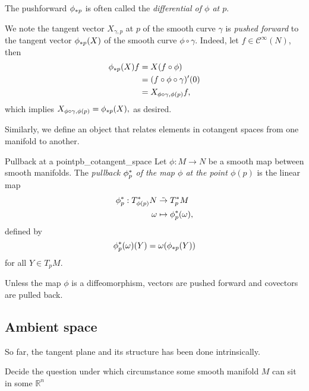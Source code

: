 \begin{remark}
    The pushforward \(\pf[p]{\phi}\) is often called the \emph{differential of \(\phi\) at \(p\)}.
\end{remark}

We note the tangent vector \(X_{\gamma,p}\) at \(p\) of the smooth curve \(\gamma\) is \emph{pushed forward} to the tangent vector \(\pf[p]{\phi}(X)\) of the smooth curve \(\phi \circ \gamma.\) Indeed, let \(f \in \mathcal{C}^\infty(N)\), then
\begin{align*}
    \pf[p]\phi(X)f &= X(f \circ \phi)\\
                   &= (f \circ \phi \circ \gamma)'(0)\\
                   &= X_{\phi \circ \gamma, \phi(p)} f,
\end{align*}
which implies \(X_{\phi \circ \gamma, \phi(p)} = \pf[p]\phi(X),\) as desired.

Similarly, we define an object that relates elements in cotangent spaces from one manifold to another.

\begin{definition}{Pullback at a point}{pb_cotangent_space}
    Let \(\phi : M \to N\) be a smooth map between smooth manifolds. The \emph{pullback \(\pb[p]\phi\) of the map \(\phi\) at the point \(\phi(p)\)} is the linear map
    \begin{align*}
        \pb[p]\phi : T_{\phi(p)}^{\ast}N &\linear T_{p}^{\ast}M\\
        \omega &\mapsto \pb[p]\phi(\omega),
    \end{align*}
    defined by
    \begin{equation*}
        \pb[p]\phi(\omega)(Y) = \omega(\pf[p]\phi(Y))
    \end{equation*}
    for all \(Y \in T_pM\).
\end{definition}
\begin{remark}
    Unless the map \(\phi\) is a diffeomorphism, vectors are pushed forward and covectors are pulled back.
\end{remark}

\subsection{Ambient space}
So far, the tangent plane and its structure has been done intrinsically.

Decide the question under which circumstance some smooth manifold \(M\) can sit in some \(\mathbb{R}^n\)

